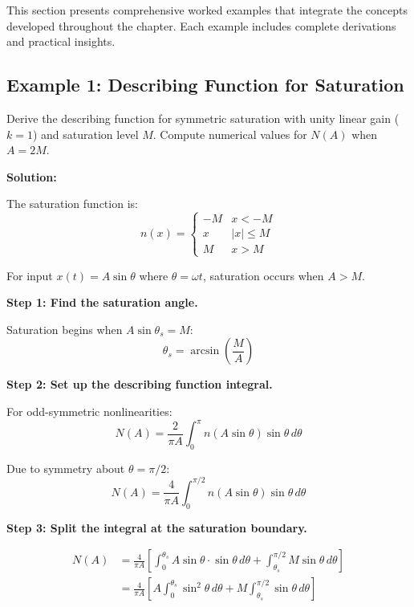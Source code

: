 This section presents comprehensive worked examples that integrate the concepts developed throughout the chapter. Each example includes complete derivations and practical insights.

\subsection{Example 1: Describing Function for Saturation}

\begin{example}
\label{ex:df_saturation_detailed}
Derive the describing function for symmetric saturation with unity linear gain ($k = 1$) and saturation level $M$. Compute numerical values for $N(A)$ when $A = 2M$.

\textbf{Solution:}

The saturation function is:
\begin{equation}
n(x) = \begin{cases}
-M & x < -M \\
x & |x| \leq M \\
M & x > M
\end{cases}
\end{equation}

For input $x(t) = A\sin\theta$ where $\theta = \omega t$, saturation occurs when $A > M$.

\textbf{Step 1: Find the saturation angle.}

Saturation begins when $A\sin\theta_s = M$:
\begin{equation}
\theta_s = \arcsin\left(\frac{M}{A}\right)
\end{equation}

\textbf{Step 2: Set up the describing function integral.}

For odd-symmetric nonlinearities:
\begin{equation}
N(A) = \frac{2}{\pi A}\int_0^{\pi} n(A\sin\theta)\sin\theta \, d\theta
\end{equation}

Due to symmetry about $\theta = \pi/2$:
\begin{equation}
N(A) = \frac{4}{\pi A}\int_0^{\pi/2} n(A\sin\theta)\sin\theta \, d\theta
\end{equation}

\textbf{Step 3: Split the integral at the saturation boundary.}

\begin{align}
N(A) &= \frac{4}{\pi A}\left[\int_0^{\theta_s} A\sin\theta \cdot \sin\theta \, d\theta + \int_{\theta_s}^{\pi/2} M \sin\theta \, d\theta\right] \\
&= \frac{4}{\pi A}\left[A\int_0^{\theta_s} \sin^2\theta \, d\theta + M\int_{\theta_s}^{\pi/2} \sin\theta \, d\theta\right]
\end{align}


\end{example}
